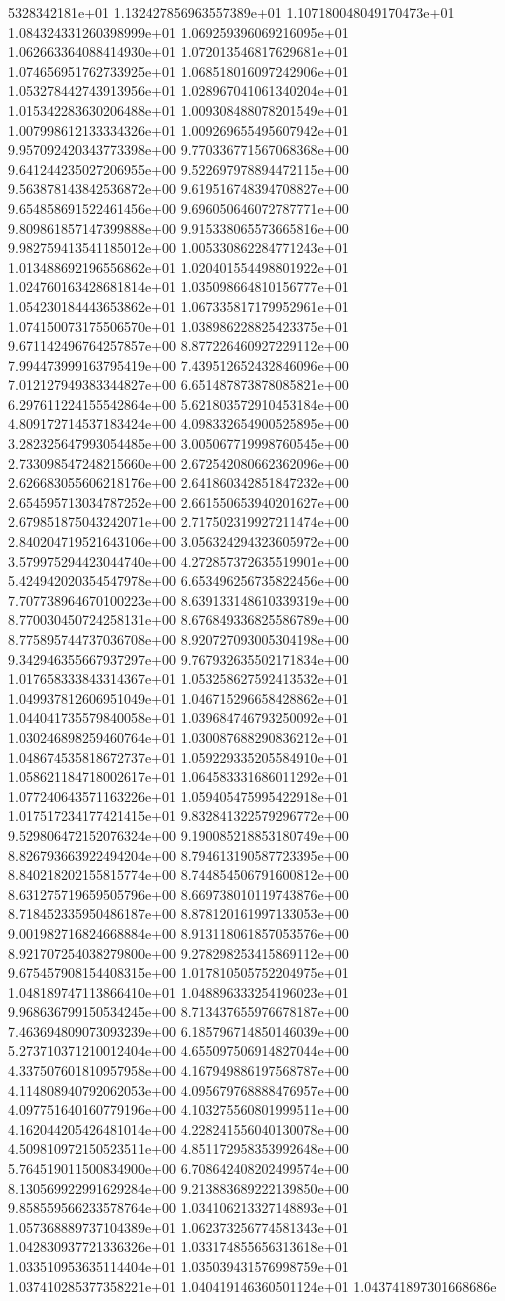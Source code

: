 5328342181e+01	1.132427856963557389e+01	1.107180048049170473e+01	1.084324331260398999e+01	1.069259396069216095e+01	1.062663364088414930e+01	1.072013546817629681e+01	1.074656951762733925e+01	1.068518016097242906e+01	1.053278442743913956e+01	1.028967041061340204e+01	1.015342283630206488e+01	1.009308488078201549e+01	1.007998612133334326e+01	1.009269655495607942e+01	9.957092420343773398e+00	9.770336771567068368e+00	9.641244235027206955e+00	9.522697978894472115e+00	9.563878143842536872e+00	9.619516748394708827e+00	9.654858691522461456e+00	9.696050646072787771e+00	9.809861857147399888e+00	9.915338065573665816e+00	9.982759413541185012e+00	1.005330862284771243e+01	1.013488692196556862e+01	1.020401554498801922e+01	1.024760163428681814e+01	1.035098664810156777e+01	1.054230184443653862e+01	1.067335817179952961e+01	1.074150073175506570e+01	1.038986228825423375e+01	9.671142496764257857e+00	8.877226460927229112e+00	7.994473999163795419e+00	7.439512652432846096e+00	7.012127949383344827e+00	6.651487873878085821e+00	6.297611224155542864e+00	5.621803572910453184e+00	4.809172714537183424e+00	4.098332654900525895e+00	3.282325647993054485e+00	3.005067719998760545e+00	2.733098547248215660e+00	2.672542080662362096e+00	2.626683055606218176e+00	2.641860342851847232e+00	2.654595713034787252e+00	2.661550653940201627e+00	2.679851875043242071e+00	2.717502319927211474e+00	2.840204719521643106e+00	3.056324294323605972e+00	3.579975294423044740e+00	4.272857372635519901e+00	5.424942020354547978e+00	6.653496256735822456e+00	7.707738964670100223e+00	8.639133148610339319e+00	8.770030450724258131e+00	8.676849336825586789e+00	8.775895744737036708e+00	8.920727093005304198e+00	9.342946355667937297e+00	9.767932635502171834e+00	1.017658333843314367e+01	1.053258627592413532e+01	1.049937812606951049e+01	1.046715296658428862e+01	1.044041735579840058e+01	1.039684746793250092e+01	1.030246898259460764e+01	1.030087688290836212e+01	1.048674535818672737e+01	1.059229335205584910e+01	1.058621184718002617e+01	1.064583331686011292e+01	1.077240643571163226e+01	1.059405475995422918e+01	1.017517234177421415e+01	9.832841322579296772e+00	9.529806472152076324e+00	9.190085218853180749e+00	8.826793663922494204e+00	8.794613190587723395e+00	8.840218202155815774e+00	8.744854506791600812e+00	8.631275719659505796e+00	8.669738010119743876e+00	8.718452335950486187e+00	8.878120161997133053e+00	9.001982716824668884e+00	8.913118061857053576e+00	8.921707254038279800e+00	9.278298253415869112e+00	9.675457908154408315e+00	1.017810505752204975e+01	1.048189747113866410e+01	1.048896333254196023e+01	9.968636799150534245e+00	8.713437655976678187e+00	7.463694809073093239e+00	6.185796714850146039e+00	5.273710371210012404e+00	4.655097506914827044e+00	4.337507601810957958e+00	4.167949886197568787e+00	4.114808940792062053e+00	4.095679768888476957e+00	4.097751640160779196e+00	4.103275560801999511e+00	4.162044205426481014e+00	4.228241556040130078e+00	4.509810972150523511e+00	4.851172958353992648e+00	5.764519011500834900e+00	6.708642408202499574e+00	8.130569922991629284e+00	9.213883689222139850e+00	9.858559566233578764e+00	1.034106213327148893e+01	1.057368889737104389e+01	1.062373256774581343e+01	1.042830937721336326e+01	1.033174855656313618e+01	1.033510953635114404e+01	1.035039431576998759e+01	1.037410285377358221e+01	1.040419146360501124e+01	1.043741897301668686e